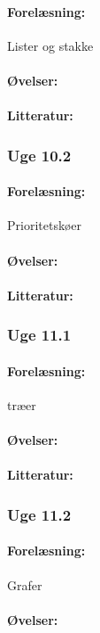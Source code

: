 \documentclass[12pt]{article}
\begin{document}
\paragraph{Forelæsning:} 
Lister og stakke
\paragraph{Øvelser:}
\paragraph{Litteratur:}

\subsubsection{Uge 10.2}
\paragraph{Forelæsning:} 
Prioritetskøer
\paragraph{Øvelser:}
\paragraph{Litteratur:}

\subsubsection{Uge 11.1}
\paragraph{Forelæsning:} 
træer
\paragraph{Øvelser:}
\paragraph{Litteratur:}
\subsubsection{Uge 11.2}
\paragraph{Forelæsning:} 
Grafer 
\paragraph{Øvelser:}
\end{document}
